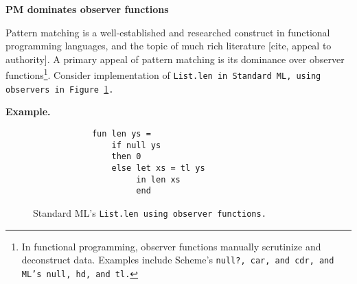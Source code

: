 \documentclass[manuscript,screen,review, 12pt]{acmart}
\begin{document}
    \begin{outline}[enumerate]
    \1 \bf{PM dominates observer functions} 
    
    Pattern matching is a well-established and researched construct in
    functional programming languages, and the topic of much rich literature
    [cite, appeal to authority]. A primary appeal of pattern matching is its
    dominance over observer functions\footnote{In functional programming,
    observer functions manually scrutinize and deconstruct data. Examples
    include Scheme's \tt{null?}, \tt{car}, and \tt{cdr}, and ML's \tt{null},
    \tt{hd}, and \tt{tl}.}. Consider implementation of \tt{List.len} in Standard
    ML, using observers in Figure~\ref{fig:observerlen}. 
    
    
    
    
    
    \2 \bf{Example. }

    \begin{figure}[ht!]
        \smllst
        \begin{verbatim}
            fun len ys =
                if null ys 
                then 0 
                else let xs = tl ys 
                     in len xs 
                     end 
        \end{verbatim}
    \caption{Standard ML's \tt{List.len} using observer functions.}
    \label{fig:observerlen}
    \end{figure}
    

\end{outline}
\end{document}
